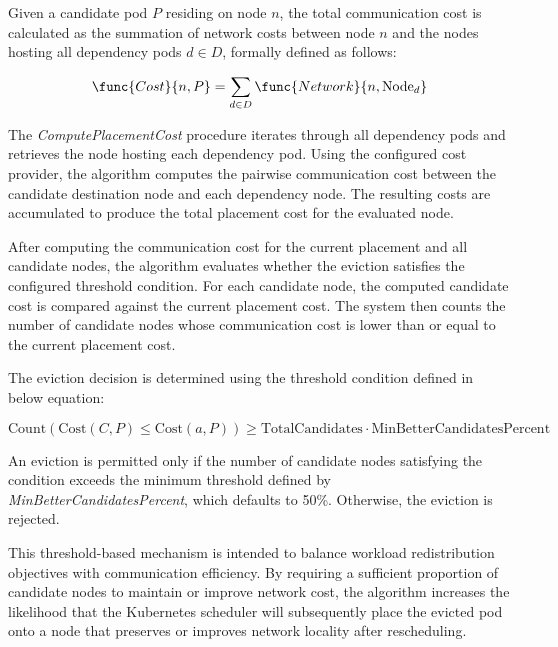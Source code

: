 

Given a candidate pod $P$ residing on node $n$, the total communication cost is calculated as the summation of network costs between node $n$ and the nodes hosting all dependency pods $d \in D$, formally defined as follows:

\[
\func{Cost}{n, P} = \sum_{d \in D} \func{Network}{n, \text{Node}_{d}}
\]

The \textit{ComputePlacementCost} procedure iterates through all dependency pods and retrieves the node hosting each dependency pod. Using the configured cost provider, the algorithm computes the pairwise communication cost between the candidate destination node and each dependency node. The resulting costs are accumulated to produce the total placement cost for the evaluated node.

After computing the communication cost for the current placement and all candidate nodes, the algorithm evaluates whether the eviction satisfies the configured threshold condition. For each candidate node, the computed candidate cost is compared against the current placement cost. The system then counts the number of candidate nodes whose communication cost is lower than or equal to the current placement cost.

The eviction decision is determined using the threshold condition defined in below equation:

\[
{\text{Count}(\text{Cost}(C, P) \leq \text{Cost}(a, P))}
\geq
{\text{TotalCandidates}} \cdot \text{MinBetterCandidatesPercent}
\]

An eviction is permitted only if the number of candidate nodes satisfying the condition exceeds the minimum threshold defined by \textit{MinBetterCandidatesPercent}, which defaults to 50\%. Otherwise, the eviction is rejected.

This threshold-based mechanism is intended to balance workload redistribution objectives with communication efficiency. By requiring a sufficient proportion of candidate nodes to maintain or improve network cost, the algorithm increases the likelihood that the Kubernetes scheduler will subsequently place the evicted pod onto a node that preserves or improves network locality after rescheduling.

